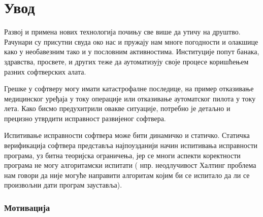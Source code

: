 \documentclass[12pt,oneside]{memoir}
\begin{document}
\frontmatter
\naslovna
\komisija
\mainmatter
\tableofcontents





\chapter{Увод} 

 Развој и примена нових технологија почињу све више да утичу на друштво. Рачунари су присутни свуда око нас и пружају нам многе погодности и олакшице како у необавезним тако и у пословним активностима. Институције попут банака, здравства, просвете, и других теже да аутоматизују своје процесе коришћењем разних софтверских алата.  
 
 Грешке у софтверу могу имати катастрофалне последице, на пример отказивање медицинског уређаја у току операције или отказивање аутоматског пилота у току лета. Како бисмо предухитрили овакве ситуације, потребно је детаљно и прецизно утврдити исправност развијеног софтвера. 
 
  Испитивање исправности софтвера може бити динамичко и статичко. Статичка верификација софтвера представља најпоузданији начин испитивања исправности програма, уз битна теоријска ограничења, јер се многи аспекти коректности програма не могу алгоритамски испитати ( нпр. неодлучивост Халтинг проблема \cite{halting} нам говори да није могуће направити алгоритам којим би се испитало да ли се произвољни дати програм зауставља). 
  
\subsection{Мотивација}
\end{document}
